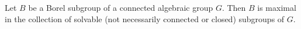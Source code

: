 Let $B$ be a Borel subgroup of a connected algebraic group $G$. Then $B$ is maximal in the collection of solvable (not necessarily connected or closed) subgroups of $G$.
